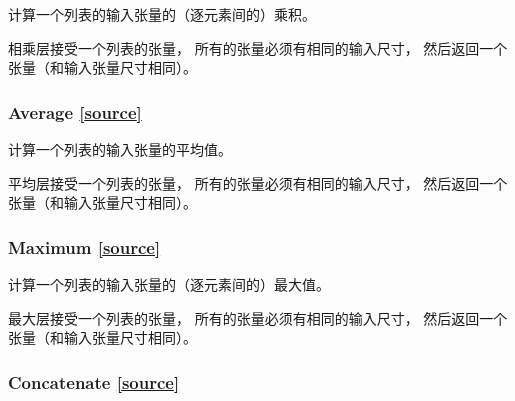 计算一个列表的输入张量的（逐元素间的）乘积。

相乘层接受一个列表的张量， 所有的张量必须有相同的输入尺寸，
然后返回一个张量（和输入张量尺寸相同）。




\subsubsection{Average {\href{https://github.com/keras-team/keras/blob/master/keras/layers/merge.py\#L275}{{[}source{]}}}}

\begin{Shaded}
\begin{Highlighting}[]
\end{Highlighting}
\end{Shaded}

计算一个列表的输入张量的平均值。

平均层接受一个列表的张量， 所有的张量必须有相同的输入尺寸，
然后返回一个张量（和输入张量尺寸相同）。




\subsubsection{Maximum {\href{https://github.com/keras-team/keras/blob/master/keras/layers/merge.py\#L290}{{[}source{]}}}}

\begin{Shaded}
\begin{Highlighting}[]
\end{Highlighting}
\end{Shaded}

计算一个列表的输入张量的（逐元素间的）最大值。

最大层接受一个列表的张量， 所有的张量必须有相同的输入尺寸，
然后返回一个张量（和输入张量尺寸相同）。




\subsubsection{Concatenate {\href{https://github.com/keras-team/keras/blob/master/keras/layers/merge.py\#L320}{{[}source{]}}}}

\begin{Shaded}
\begin{Highlighting}[]
\OperatorTok{=-}\NormalTok{)}
\end{Highlighting}
\end{Shaded}

